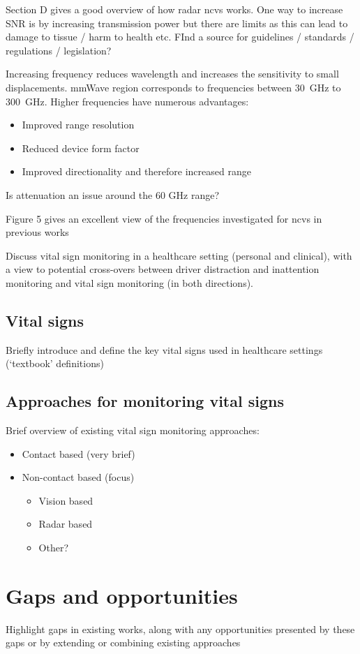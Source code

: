\documentclass[11pt, parskip=half*,twoside=false]{scrbook}
\begin{document}
Section D gives a good overview of how radar \gls{ncvs} works. One way to increase SNR is by increasing transmission power but there are limits as this can lead to damage to tissue / harm to health etc. FInd a source for guidelines / standards / regulations / legislation?

Increasing frequency reduces wavelength and increases the sensitivity to small displacements. mmWave region corresponds to frequencies between 30~GHz to 300~GHz.  Higher frequencies have numerous advantages:
\begin{itemize}
	\item Improved range resolution
	\item Reduced device form factor
	\item Improved directionality and therefore increased range
\end{itemize}

Is attenuation an issue around the 60 GHz range?

Figure 5 gives an excellent view of the frequencies investigated for \gls{ncvs} in previous works


Discuss vital sign monitoring in a healthcare setting (personal and clinical), with a view to potential cross-overs between driver distraction and inattention monitoring and vital sign monitoring (in both directions).
\subsection{Vital signs} \label{ssec:vital_signs}
Briefly introduce and define the key vital signs used in healthcare settings (`textbook' definitions)
\subsection{Approaches for monitoring vital signs}
Brief overview of existing vital sign monitoring approaches:
\begin{itemize}
	\item Contact based (very brief)
	\item Non-contact based (focus)
	\begin{itemize}
		\item Vision based
		\item Radar based
		\item Other?
	\end{itemize}
\end{itemize}

\section{Gaps and opportunities}
Highlight gaps in existing works, along with any opportunities presented by these gaps or by extending or combining existing approaches
\end{document}
